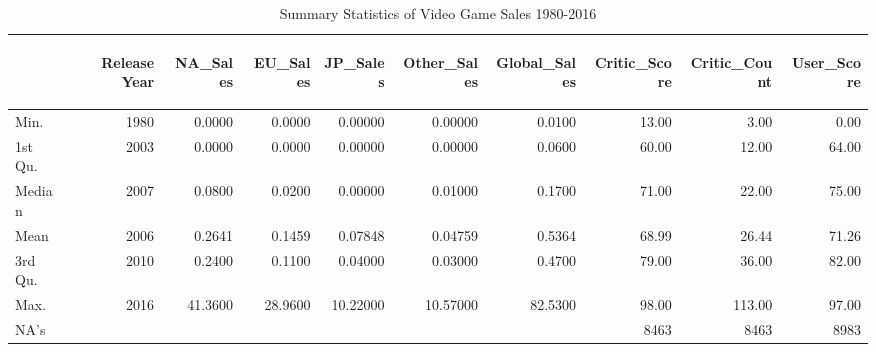 \documentclass[12pt,english]{article}
\begin{document}


\begin{table}[ht]
\centering
\caption{Summary Statistics of Video Game Sales 1980-2016}
\label{tab:descriptive-vg}
\begin{tabularx}{\textwidth}{X *{9}{r}} %
\toprule
& \begin{sideways}Release Year\end{sideways} & \begin{sideways}NA\_Sales\end{sideways} & \begin{sideways}EU\_Sales\end{sideways} & \begin{sideways}JP\_Sales\end{sideways} & \begin{sideways}Other\_Sales\end{sideways} & \begin{sideways}Global\_Sales\end{sideways} & \begin{sideways}Critic\_Score\end{sideways} & \begin{sideways}Critic\_Count\end{sideways} & \begin{sideways}User\_Score\end{sideways} \\ 
\midrule
Min. & 1980 & 0.0000 & 0.0000 & 0.00000 & 0.00000 & 0.0100 & 13.00 & 3.00 & 0.00 \\ 
1st Qu. & 2003 & 0.0000 & 0.0000 & 0.00000 & 0.00000 & 0.0600 & 60.00 & 12.00 & 64.00 \\ 
Median & 2007 & 0.0800 & 0.0200 & 0.00000 & 0.01000 & 0.1700 & 71.00 & 22.00 & 75.00 \\ 
Mean & 2006 & 0.2641 & 0.1459 & 0.07848 & 0.04759 & 0.5364 & 68.99 & 26.44 & 71.26 \\ 
3rd Qu. & 2010 & 0.2400 & 0.1100 & 0.04000 & 0.03000 & 0.4700 & 79.00 & 36.00 & 82.00 \\ 
Max. & 2016 & 41.3600 & 28.9600 & 10.22000 & 10.57000 & 82.5300 & 98.00 & 113.00 & 97.00 \\ 
NA's & & & & & & & 8463 & 8463 & 8983 \\ 
\bottomrule
\end{tabularx}
\end{table}
\end{document}
